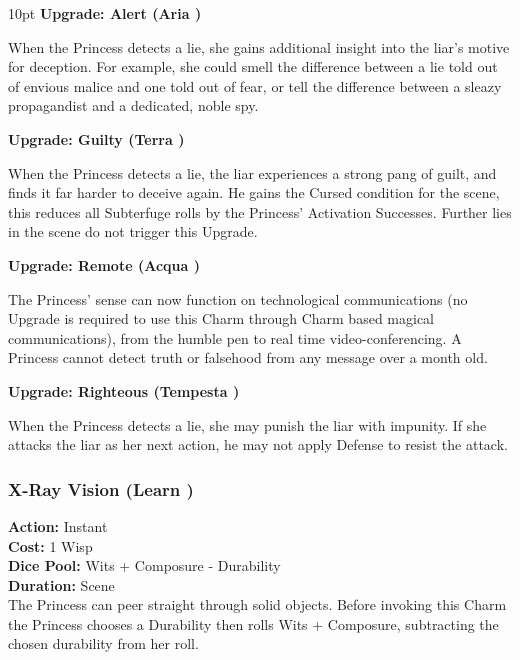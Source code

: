 \begin{myindentpar}{10pt}
\textbf{Upgrade: Alert (Aria \textbullet)}

When the Princess detects a lie, she gains additional insight into the liar's motive for deception. For example, she could smell the difference between a lie told out of envious malice and one told out of fear, or tell the difference between a sleazy propagandist and a dedicated, noble spy.

\textbf{Upgrade: Guilty (Terra \textbullet)}

When the Princess detects a lie, the liar experiences a strong pang of guilt, and finds it far harder to deceive again. He gains the Cursed condition for the scene, this reduces all Subterfuge rolls by the Princess' Activation Successes. Further lies in the scene do not trigger this Upgrade.

\textbf{Upgrade: Remote (Acqua \textbullet)}

The Princess' sense can now function on technological communications (no Upgrade is required to use this Charm through Charm based magical communications), from the humble pen to real time video-conferencing. A Princess cannot detect truth or falsehood from any message over a month old. 

\textbf{Upgrade: Righteous (Tempesta \textbullet)}

When the Princess detects a lie, she may punish the liar with impunity. If she attacks the liar as her next action, he may not apply Defense to resist the attack.\end{myindentpar}

\subsubsection*{X-Ray Vision (Learn \textbullet)}

\noindent \textbf{Action:} Instant \\

\noindent \textbf{Cost:} 1 Wisp \\

\noindent \textbf{Dice Pool:} Wits + Composure - Durability \\

\noindent \textbf{Duration:} Scene \\

\noindent The Princess can peer straight through solid objects. Before invoking this Charm the Princess chooses a Durability then rolls Wits + Composure, subtracting the chosen durability from her roll. 


